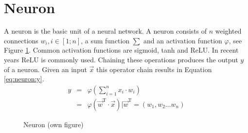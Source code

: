 	\section{Neuron}
		\label{sec:neuron}
		A neuron is the basic unit of a neural network. A neuron consists of  $n$ weighted connections  $w_i, i \in [1;n]$, a sum function $\sum$ and an activation function $\varphi$\autocite{Jain.1996}, see Figure \ref{img:neuron}. Common activation functions are sigmoid, tanh and \ac{ReLU}. In recent years \ac{ReLU} is commonly used.\autocite{LeCun.2015} Chaining these operations produces the output $y$ of a neuron. Given an input $\vec{x}$ this operator chain results in Equation \eqref{eq:neuron:y}.\autocite{Jain.1996}
		\begin{equation}
			\label{eq:neuron:y}
			\begin{array}{lcl}
			y & = & \varphi(\sum_{i=1}^{n} x_i \cdot w_i)\\
			& = & \varphi(\vec{w}^{\mathrm {T}} \cdot \vec{x}) | \vec{w}^{\mathrm {T}}=(w_1, w_2 \dots w_n)
			\end{array}
			\end{equation}
		\begin{figure}[H]
			\centering
			\caption{Neuron (own figure)} \label{img:neuron}
		\end{figure}


